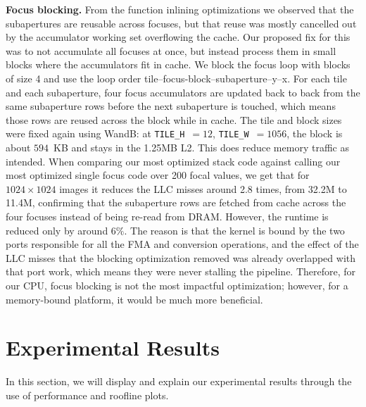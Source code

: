 \documentclass[letterpaper]{article}
\newcommand{\mypar}[1]{{\bf #1.}}
\begin{document}
\mypar{Focus blocking} From the function inlining optimizations we observed that the subapertures are reusable across focuses, but that reuse was mostly cancelled out by the accumulator working set overflowing the cache. Our proposed fix for this was to not accumulate all focuses at once, but instead process them in small blocks where the accumulators fit in cache. We block the focus loop with blocks of size 4 and use the loop order tile--focus-block--subaperture--y--x. For each tile and each subaperture, four focus accumulators are updated back to back from the same subaperture rows before the next subaperture is touched, which means those rows are reused across the block while in cache. The tile and block sizes were fixed again using WandB\cite{wandb}: at \texttt{TILE\_H}~$=12$,
\texttt{TILE\_W}~$=1056$, the block is about $594$~KB and stays in the 1.25MB L2. This does reduce memory traffic as intended. When comparing our most optimized stack code against calling our most optimized single focus code over 200 focal values, we get that for $1024\times1024$ images it reduces the LLC misses around 2.8 times, from 32.2M to 11.4M, confirming that the subaperture rows are fetched from cache across the four focuses instead of being re-read from DRAM. However, the runtime is reduced only by around $6\%$. The reason is that the kernel is bound by the two ports responsible for all the FMA and conversion operations, and the effect of the LLC misses that the blocking optimization removed was already overlapped with that port work, which means they were never stalling the pipeline. Therefore, for our CPU, focus blocking is not the most impactful optimization; however, for a memory-bound platform, it would be much more beneficial.

\section{Experimental Results}\label{sec:exp}


In this section, we will display and explain our experimental results through the use of performance and roofline plots.

\end{document}
